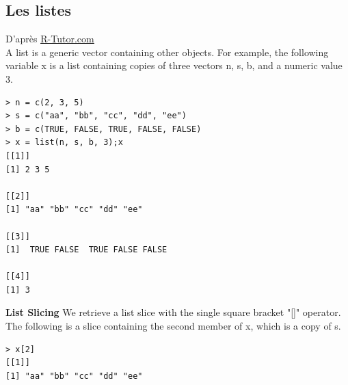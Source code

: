 \subsection{Les listes}
D'après \href{http://www.r-tutor.com/r-introduction/list}{\underline{R-Tutor.com}}\newline
\\
A list is a generic vector containing other objects.\newline
For example, the following variable x is a list containing copies of three vectors n, s, b, and a numeric value 3. 
\begin{lstlisting}[language=html]
> n = c(2, 3, 5)
> s = c("aa", "bb", "cc", "dd", "ee")
> b = c(TRUE, FALSE, TRUE, FALSE, FALSE)
> x = list(n, s, b, 3);x
[[1]]
[1] 2 3 5

[[2]]
[1] "aa" "bb" "cc" "dd" "ee"

[[3]]
[1]  TRUE FALSE  TRUE FALSE FALSE

[[4]]
[1] 3
\end{lstlisting}
\textbf{List Slicing}\newline
We retrieve a list slice with the single square bracket "[]" operator. The following is a slice containing the second member of x, which is a copy of s. 
\begin{lstlisting}[language=html]
> x[2]
[[1]]
[1] "aa" "bb" "cc" "dd" "ee"
\end{lstlisting}

